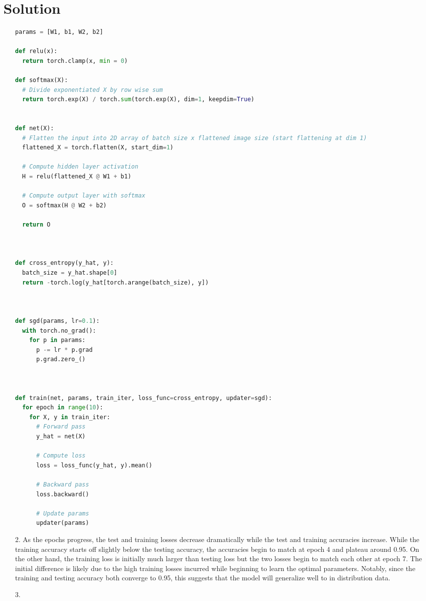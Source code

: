 \documentclass[submit]{../harvardml}
\newenvironment{answer}
  {\section*{Solution}}
{}
\begin{document}
\begin{answer}
\begin{enumerate}
\begin{lstlisting}[language=Python]
params = [W1, b1, W2, b2]

def relu(x):
  return torch.clamp(x, min = 0)

def softmax(X):
  # Divide exponentiated X by row wise sum
  return torch.exp(X) / torch.sum(torch.exp(X), dim=1, keepdim=True)


def net(X):
  # Flatten the input into 2D array of batch size x flattened image size (start flattening at dim 1)
  flattened_X = torch.flatten(X, start_dim=1)  

  # Compute hidden layer activation
  H = relu(flattened_X @ W1 + b1)

  # Compute output layer with softmax
  O = softmax(H @ W2 + b2)
  
  return O



def cross_entropy(y_hat, y):
  batch_size = y_hat.shape[0]
  return -torch.log(y_hat[torch.arange(batch_size), y])



def sgd(params, lr=0.1):
  with torch.no_grad():
    for p in params:
      p -= lr * p.grad 
      p.grad.zero_() 



def train(net, params, train_iter, loss_func=cross_entropy, updater=sgd):
  for epoch in range(10):
    for X, y in train_iter:
      # Forward pass
      y_hat = net(X)

      # Compute loss
      loss = loss_func(y_hat, y).mean()

      # Backward pass
      loss.backward()

      # Update params
      updater(params)

\end{lstlisting}

    \item[2.] As the epochs progress, the test and training losses decrease dramatically while the test and training accuracies increase. While the training accuracy starts off slightly below the testing accuracy, the accuracies begin to match at epoch 4 and plateau around 0.95. On the other hand, the training loss is initially much larger than testing loss but the two losses begin to match each other at epoch 7. The initial difference is likely due to the high training losses incurred while beginning to learn the optimal parameters. Notably, since the training and testing accuracy both converge to 0.95, this suggests that the model will generalize well to in distribution data.

    \item[3.]


\end{enumerate}
\end{answer}
\end{document}
